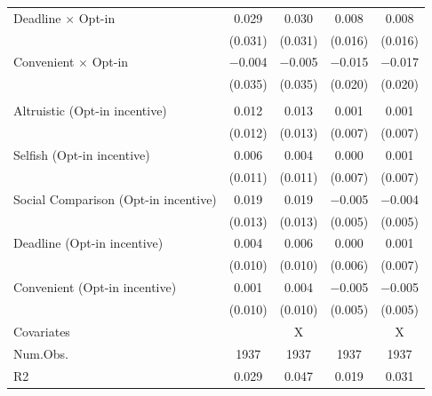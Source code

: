 \documentclass[
]{article}
\begin{document}
\begin{table}
\begin{threeparttable}
\begin{tabular}[t]{lcccc}
Deadline $\times$ Opt-in & \num{0.029} & \num{0.030} & \num{0.008} & \num{0.008}\\
 & (\num{0.031}) & (\num{0.031}) & (\num{0.016}) & (\num{0.016})\\
Convenient $\times$ Opt-in & \num{-0.004} & \num{-0.005} & \num{-0.015} & \num{-0.017}\\
 & (\num{0.035}) & (\num{0.035}) & (\num{0.020}) & (\num{0.020})\\
\addlinespace[0.3em]
\multicolumn{5}{l}{\textbf{Linear combination test: Treatment + Opt-in $\times$ Treatment}}\\
\hspace{1em}Altruistic (Opt-in incentive) & \num{0.012} & \num{0.013} & \num{0.001} & \num{0.001}\\
\hspace{1em} & (\num{0.012}) & (\num{0.013}) & (\num{0.007}) & (\num{0.007})\\
\hspace{1em}Selfish (Opt-in incentive) & \num{0.006} & \num{0.004} & \num{0.000} & \num{0.001}\\
\hspace{1em} & (\num{0.011}) & (\num{0.011}) & (\num{0.007}) & (\num{0.007})\\
\hspace{1em}Social Comparison (Opt-in incentive) & \num{0.019} & \num{0.019} & \num{-0.005} & \num{-0.004}\\
\hspace{1em} & (\num{0.013}) & (\num{0.013}) & (\num{0.005}) & (\num{0.005})\\
\hspace{1em}Deadline (Opt-in incentive) & \num{0.004} & \num{0.006} & \num{0.000} & \num{0.001}\\
\hspace{1em} & (\num{0.010}) & (\num{0.010}) & (\num{0.006}) & (\num{0.007})\\
\hspace{1em}Convenient (Opt-in incentive) & \num{0.001} & \num{0.004} & \num{-0.005} & \num{-0.005}\\
\hspace{1em} & (\num{0.010}) & (\num{0.010}) & (\num{0.005}) & (\num{0.005})\\
\midrule
Covariates &  & X &  & X\\
Num.Obs. & \num{1937} & \num{1937} & \num{1937} & \num{1937}\\
R2 & \num{0.029} & \num{0.047} & \num{0.019} & \num{0.031}\\

\end{tabular}
\end{threeparttable}
\end{table}
\end{document}
